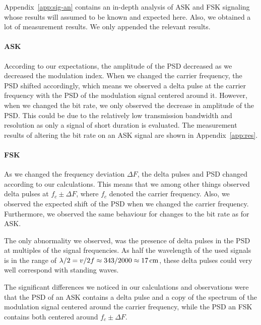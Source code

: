 \documentclass[11pt,titlepage]{report}
\begin{document}
Appendix~\ref{app:sig-an} contains an in-depth analysis of ASK and FSK signaling whose results will assumed to be known and expected here. Also, we obtained a lot of measurement results. We only appended the relevant results.

\paragraph{ASK} According to our expectations, the amplitude of the PSD decreased as we decreased the modulation index. When we changed the carrier frequency, the PSD shifted accordingly, which means we observed a delta pulse at the carrier frequency with the PSD of the modulation signal centered around it. However, when we changed the bit rate, we only observed the decrease in amplitude of the PSD. This could be due to the relatively low transmission bandwidth and resolution as only a signal of short duration is evaluated. The measurement results of altering the bit rate on an ASK signal are shown in Appendix~\ref{app:res}.

\paragraph{FSK} As we changed the frequency deviation $\Delta F$, the delta pulses and PSD changed according to our calculations. This means that we among other things observed delta pulses at $f_c\pm \Delta F$, where $f_c$ denoted the carrier frequency. Also, we observed the expected shift of the PSD when we changed the carrier frequency. Furthermore, we observed the same behaviour for changes to the bit rate as for ASK.

The only abnormality we observed, was the presence of delta pulses in the PSD at multiples of the signal frequencies. As half the wavelength of the used signals is in the range of $\lambda/2=v/2f\approx 343/2000\approx\text{\SI{17}{cm}}$, these delta pulses could very well correspond with standing waves.

The significant differences we noticed in our calculations and observations were that the PSD of an ASK contains a delta pulse and a copy of the spectrum of the modulation signal centered around the carrier frequency, while the PSD an FSK contains both centered around $f_c\pm \Delta F$.
\end{document}
